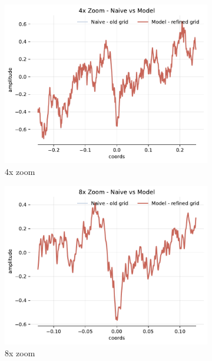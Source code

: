 \begin{figure}[h]
    \begin{subfigure}[b]{0.32\textwidth}
        \centering
        \includegraphics[width=\textwidth]{img/ch4/noise-4x-hf4096-w512.pdf}
        \caption{4x zoom}
    \end{subfigure}
    \begin{subfigure}[b]{0.32\textwidth}
        \centering
        \includegraphics[width=\textwidth]{img/ch4/noise-8x-hf4096-w512.pdf}
        \caption{8x zoom}
    \end{subfigure}
    \begin{subfigure}[b]{0.32\textwidth}
        \centering

\end{subfigure}
\end{figure}
